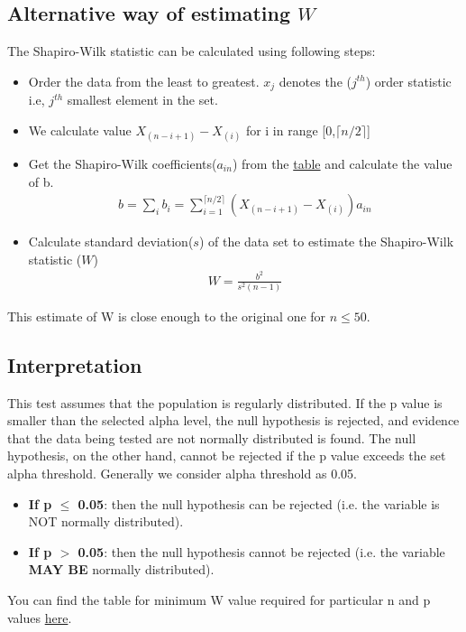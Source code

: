 \documentclass{article}
\begin{document}
\subsection{Alternative way of estimating $W$}
\noindent The Shapiro-Wilk statistic can be calculated using following steps:
   \begin{itemize}
           \item Order the data from the least to greatest. $x_{j}$ denotes the ($j^{th}$) order statistic i.e, $j^{th}$ smallest element in the set.
           \item We calculate value $X_{(n-i+1)}-X_{(i)}$ for i in range [0,$\lceil{n/2}\rceil$]
           \item Get the Shapiro-Wilk coefficients($a_{in}$) from the \href{https://github.com/cmaspi/verifying_CLT/tree/main/latex/report/images/coefficients}{table} and calculate the value of b.
            \begin{align}
              b=\sum_{i} b_{i} = \sum_{i=1}^{\lceil{n/2}\rceil} \left(X_{(n-i+1)}-X_{(i)}\right) a_{in} 
            \end{align}
            \item Calculate standard deviation($s$) of the data set to estimate the Shapiro-Wilk statistic ($W$)
            \begin{align}
                W = \frac{b^{2}}{s^{2}(n-1)}
            \end{align}
       \end{itemize}
       This estimate of W is close enough to the original one for $n\leq50$.

\subsection{Interpretation}
This test assumes that the population is regularly distributed. If the p value is smaller than the selected alpha level, the null hypothesis is rejected, and evidence that the data being tested are not normally distributed is found. The null hypothesis, on the other hand, cannot be rejected if the p value exceeds the set alpha threshold. Generally we consider alpha threshold as 0.05.
\begin{itemize}
    \item \textbf{If p $\leq$ 0.05}: then the null hypothesis can be rejected (i.e. the variable is NOT normally distributed).
    \item \textbf{If p $>$ 0.05}: then the null hypothesis cannot be rejected (i.e. the variable \textbf{MAY BE} normally distributed).
\end{itemize}
You can find the table for minimum W value required for particular  n and p values
\href{https://github.com/cmaspi/verifying_CLT/tree/main/latex/report/images/p_value}{here}.\\
\end{document}
